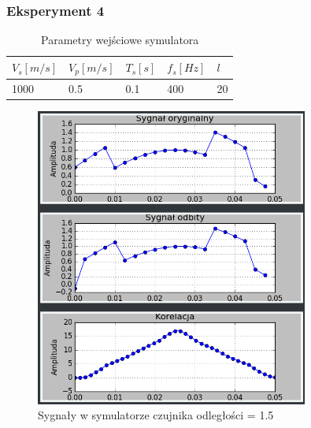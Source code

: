 \documentclass{article}
\begin{document}
{        \subsubsection{Eksperyment 4} {
            \begin{table}[h!]
                \centering
                \begin{tabular}{|l|l|l|l|l|}
                    \hline
                    $V_s[m/s]$ & $V_p[m/s]$ & $T_s[s]$ & $f_s[Hz]$ & $l$ \\ \hline
                    1000       & 0.5        & 0.1      & 400       & 20 \\ \hline
                \end{tabular}
                \caption{Parametry wejściowe symulatora}
            \end{table}
            \begin{figure}[h!]
                \centering
                \includegraphics[width=0.8\textwidth]{img/sim13.png}
                \caption{Sygnały w symulatorze czujnika odległości = 1.5}
            \end{figure}
            \begin{figure}[h!]
                \centering

\end{figure}}}
\end{document}
